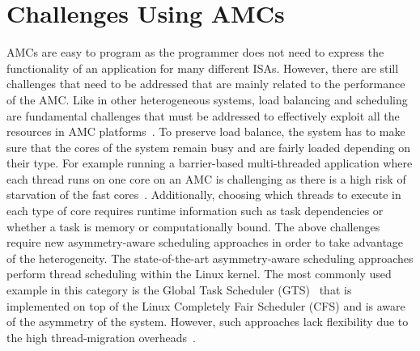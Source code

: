 \section{Challenges Using AMCs}
AMCs are easy to program as the programmer does not need to express the functionality of an application for many different ISAs. 
However, there are still challenges that need to be addressed that are mainly related to the performance of the AMC.
Like in other heterogeneous systems, load balancing and scheduling are fundamental challenges that must be addressed to effectively exploit all the resources in AMC platforms~\cite{Suleman:APLOS2009,Fedorova2009,Greenhalgh2011,Joao:ASPLOS2012,Joao:ISCA2013,ARM4HPC_SC13}. 
To preserve load balance, the system has to make sure that the cores of the system remain busy and are fairly loaded depending on their type.
For example running a barrier-based multi-threaded application where each thread runs on one core on an AMC is challenging as there is a high risk of starvation of the fast cores~\cite{AMC_survey}. %
Additionally, choosing which threads to execute in each type of core requires runtime information such as task dependencies or whether a task is memory or computationally bound.
The above challenges require new asymmetry-aware scheduling approaches in order to take advantage of the heterogeneity.
The state-of-the-art asymmetry-aware scheduling approaches perform thread scheduling within the Linux kernel. 
The most commonly used example in this category is the Global Task Scheduler (GTS)~\cite{?} that is implemented on top of the Linux Completely Fair Scheduler (CFS) and is aware of the asymmetry of the system.
However, such approaches lack flexibility due to the high thread-migration overheads~\cite{AMC_survey}.




